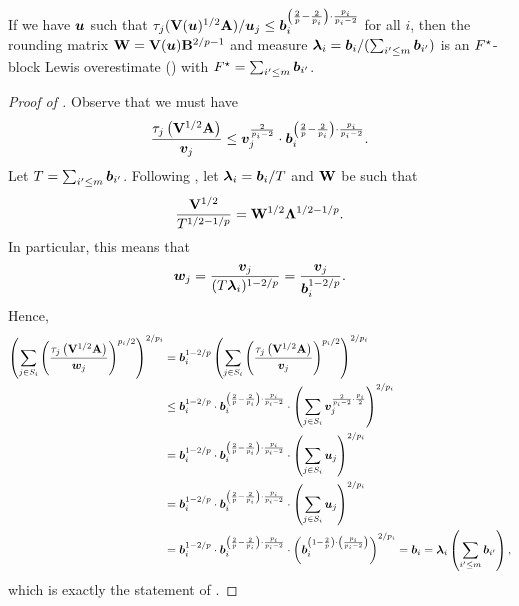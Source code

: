 \documentclass[11pt]{article}
\numberwithin{equation}{section}
\begin{document}
\begin{lemma}
\label{lemma:blw_overestimates_conversion}
If we have $\bm{u}$ such that $\tau_j(\mathbf{V}(\bm{u})^{1/2}\mathbf{A})/\bm{u}_j \le \bm{b}_i^{\left(\frac{2}{p}-\frac{2}{p_i}\right)\cdot\frac{p_i}{p_i-2}}$ for all $i$, then the rounding matrix $\mathbf{W} = \mathbf{V}(\bm{u})\mathbf{B}^{2/p-1}$ and measure $\bm{\lambda}_i = \bm{b}_i/(\sum_{i'\le m} \bm{b}_{i'})$ is an $F^{\star}$-block Lewis overestimate () with $F^{\star} = \sum_{i'\le m} \bm{b}_{i'}$.
\end{lemma}
\begin{proof}[Proof of ]
Observe that we must have
\begin{align*}
    \frac{\tau_j\left(\mathbf{V}^{1/2}\mathbf{A}\right)}{\bm{v}_j} \le \bm{v}_j^{\frac{2}{p_i-2}} \cdot \bm{b}_i^{\left(\frac{2}{p}-\frac{2}{p_i}\right)\cdot\frac{p_i}{p_i-2}}.
\end{align*}
Let $T = \sum_{i' \le m} \bm{b}_{i'}$. Following , let $\bm{\lambda}_i = \bm{b}_i/T$ and $\mathbf{W}$ be such that
\begin{align*}
    \frac{\mathbf{V}^{1/2}}{T^{1/2-1/p}} = \mathbf{W}^{1/2}\mathbf{\Lambda}^{1/2-1/p}.
\end{align*}
In particular, this means that
\begin{align*}
    \bm{w}_j = \frac{\bm{v}_j}{(T\bm{\lambda}_i)^{1-2/p}} = \frac{\bm{v}_j}{\bm{b}_i^{1-2/p}}.
\end{align*}
Hence,
\begin{align*}
    \left(\sum_{j \in S_i} \left(\frac{\tau_j\left(\mathbf{V}^{1/2}\mathbf{A}\right)}{\bm{w}_j}\right)^{p_i/2}\right)^{2/p_i} &= \bm{b}_i^{1-2/p}\left(\sum_{j \in S_i} \left(\frac{\tau_j\left(\mathbf{V}^{1/2}\mathbf{A}\right)}{\bm{v}_j}\right)^{p_i/2}\right)^{2/p_i} \\
    &\le \bm{b}_i^{1-2/p} \cdot \bm{b}_i^{\left(\frac{2}{p}-\frac{2}{p_i}\right)\cdot\frac{p_i}{p_i-2}} \cdot \left(\sum_{j \in S_i} \bm{v}_{j}^{\frac{2}{p_i-2} \cdot \frac{p_i}{2}}\right)^{2/p_i} \\
    &= \bm{b}_i^{1-2/p}\cdot\bm{b}_i^{\left(\frac{2}{p}-\frac{2}{p_i}\right)\cdot\frac{p_i}{p_i-2}} \cdot \left(\sum_{j \in S_i} \bm{u}_j\right)^{2/p_i} \\
    &= \bm{b}_i^{1-2/p}\cdot\bm{b}_i^{\left(\frac{2}{p}-\frac{2}{p_i}\right)\cdot\frac{p_i}{p_i-2}} \cdot \left(\sum_{j \in S_i} \bm{u}_j\right)^{2/p_i} \\
    &= \bm{b}_i^{1-2/p}\cdot\bm{b}_i^{\left(\frac{2}{p}-\frac{2}{p_i}\right)\cdot\frac{p_i}{p_i-2}} \cdot \left(\bm{b}_i^{\left(1-\frac{2}{p}\right)\cdot\left(\frac{p_i}{p_i-2}\right)}\right)^{2/p_i} = \bm{b}_i = \bm{\lambda}_i\left(\sum_{i'\le m} \bm{b}_{i'}\right),
\end{align*}
which is exactly the statement of .
\end{proof}
\end{document}
